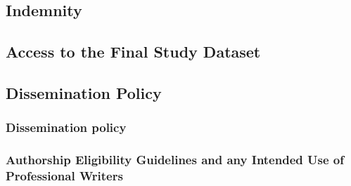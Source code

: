 \documentclass{article}
\begin{document}
\subsection{Indemnity}
\subsection{Access to the Final Study Dataset}

\subsection{Dissemination Policy}
\subsubsection{Dissemination policy}
\subsubsection{Authorship Eligibility Guidelines and any Intended Use of Professional Writers}

\printbibliography
\end{document}
